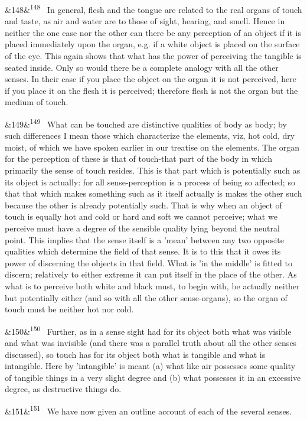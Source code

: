 \documentclass[12pt]{article}
\newcommand{\para}[1][]{\par\noindent\ifx&#1&\else\textsuperscript{\footnotesize #1}~\fi}
\begin{document}
\para[148] In general, flesh and the tongue are related to the real organs of touch and taste, as air and water are to those of sight, hearing, and smell. Hence in neither the one case nor the other can there be any perception of an object if it is placed immediately upon the organ, e.g. if a white object is placed on the surface of the eye. This again shows that what has the power of perceiving the tangible is seated inside. Only so would there be a complete analogy with all the other senses. In their case if you place the object on the organ it is not perceived, here if you place it on the flesh it is perceived; therefore flesh is not the organ but the medium of touch.

\para[149] What can be touched are distinctive qualities of body as body; by such differences I mean those which characterize the elements, viz, hot cold, dry moist, of which we have spoken earlier in our treatise on the elements. The organ for the perception of these is that of touch-that part of the body in which primarily the sense of touch resides. This is that part which is potentially such as its object is actually: for all sense-perception is a process of being so affected; so that that which makes something such as it itself actually is makes the other such because the other is already potentially such. That is why when an object of touch is equally hot and cold or hard and soft we cannot perceive; what we perceive must have a degree of the sensible quality lying beyond the neutral point. This implies that the sense itself is a 'mean' between any two opposite qualities which determine the field of that sense. It is to this that it owes its power of discerning the objects in that field. What is 'in the middle' is fitted to discern; relatively to either extreme it can put itself in the place of the other. As what is to perceive both white and black must, to begin with, be actually neither but potentially either (and so with all the other sense-organs), so the organ of touch must be neither hot nor cold.

\para[150] Further, as in a sense sight had for its object both what was visible and what was invisible (and there was a parallel truth about all the other senses discussed), so touch has for its object both what is tangible and what is intangible. Here by 'intangible' is meant (a) what like air possesses some quality of tangible things in a very slight degree and (b) what possesses it in an excessive degree, as destructive things do.

\para[151] We have now given an outline account of each of the several senses.
\end{document}
